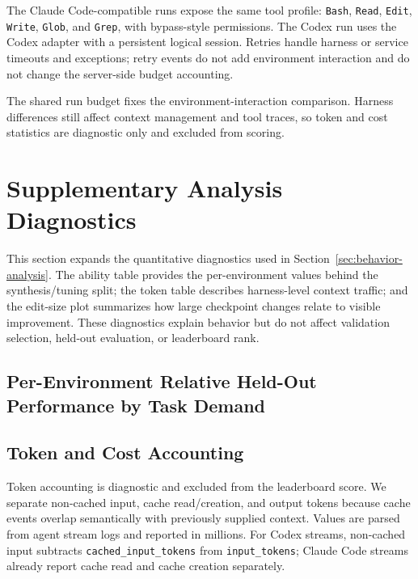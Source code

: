 The Claude Code-compatible runs expose the same tool profile:
\texttt{Bash}, \texttt{Read}, \texttt{Edit}, \texttt{Write}, \texttt{Glob}, and
\texttt{Grep}, with bypass-style permissions. The Codex run uses the Codex
adapter with a persistent logical session. Retries handle harness or service
timeouts and exceptions; retry events do not add environment interaction and do
not change the server-side budget accounting.

The shared run budget fixes the environment-interaction comparison. Harness
differences still affect context management and tool traces, so token and cost
statistics are diagnostic only and excluded from scoring.

\section{Supplementary Analysis Diagnostics}
\label{app:additional-diagnostics}

This section expands the quantitative diagnostics used in
Section~\ref{sec:behavior-analysis}. The ability table provides the
per-environment values behind the synthesis/tuning split; the token table
describes harness-level context traffic; and the edit-size plot summarizes how
large checkpoint changes relate to visible improvement. These diagnostics
explain behavior but do not affect validation selection, held-out evaluation, or
leaderboard rank.

\subsection{Per-Environment Relative Held-Out Performance by Task Demand}
\label{app:ability-split-detail}



\subsection{Token and Cost Accounting}
\label{app:cost-diagnostics}
\label{app:token-accounting}

Token accounting is diagnostic and excluded from the leaderboard score. We
separate non-cached input, cache read/creation, and output tokens because cache
events overlap semantically with previously supplied context. Values are parsed
from agent stream logs and reported in millions. For Codex streams, non-cached
input subtracts \texttt{cached\_input\_tokens} from \texttt{input\_tokens};
Claude Code streams already report cache read and cache creation separately.


